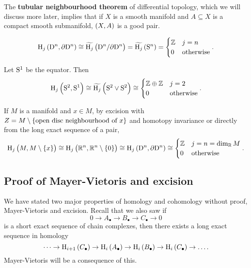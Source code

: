 \begin{remark*}
The \textbf{tubular neighbourhood theorem} of differential topology, which we will discuss more later, implies that if $ X $ is a smooth manifold and $ A \subseteq X $ is a compact smooth submanifold, $ \br{X, A} $ is a good pair.
\end{remark*}

\begin{example*}
$$ \H_j\br{\D^n, \da\D^n} \cong \widetilde{\H_j}\br{\D^n / \da\D^n} = \widetilde{\H_j}\br{\S^n} =
\begin{cases}
\ZZ & j = n \\
0 & \text{otherwise}
\end{cases}.
$$
\end{example*}

\begin{example*}
Let $ \S^1 $ be the equator. Then
$$ \H_j\br{\S^2, \S^1} \cong \widetilde{\H_j}\br{\S^2 \vee \S^2} \cong
\begin{cases}
\ZZ \oplus \ZZ & j = 2 \\
0 & \text{otherwise}
\end{cases}.
$$
\end{example*}

\begin{remark*}
If $ M $ is a manifold and $ x \in M $, by excision with $ Z = M \setminus \cbr{\text{open disc neighbourhood of} \ x} $ and homotopy invariance or directly from the long exact sequence of a pair,
$$ \H_j\br{M, M \setminus \cbr{x}} \cong \H_j\br{\RR^n, \RR^n \setminus \cbr{0}} \cong \H_j\br{\D^n, \da\D^n} \cong
\begin{cases}
\ZZ & j = n = \dim_\RR M \\
0 & \text{otherwise}
\end{cases}.
$$
\end{remark*}

\pagebreak

\subsection{Proof of Mayer-Vietoris and excision}


We have stated two major properties of homology and cohomology without proof, Mayer-Vietoris and excision. Recall that we also saw if
$$ 0 \to A_\bullet \to B_\bullet \to C_\bullet \to 0 $$
is a short exact sequence of chain complexes, then there exists a long exact sequence in homology
$$ \dots \to \H_{i + 1}\br{C_\bullet} \to \H_i\br{A_\bullet} \to \H_i\br{B_\bullet} \to \H_i\br{C_\bullet} \to \dots. $$
Mayer-Vietoris will be a consequence of this.

